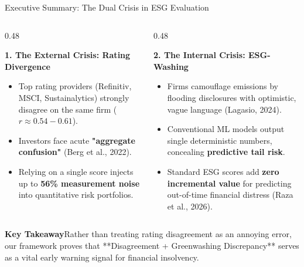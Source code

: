 \documentclass[aspectratio=169,10pt]{beamer}
\newcommand{\takeaway}[1]{\vspace{2pt}\begin{alertblock}{\textbf{Key Takeaway}}#1\end{alertblock}}
\begin{document}
\begin{frame}[t]{Executive Summary: The Dual Crisis in ESG Evaluation}
\small
\begin{columns}[T]
  \begin{column}{0.48\textwidth}
    \begin{block}{\textbf{1. The External Crisis: Rating Divergence}}
      \begin{itemize}\setlength{\itemsep}{3pt}
        \item Top rating providers (Refinitiv, MSCI, Sustainalytics) strongly disagree on the same firm ($r \approx 0.54 - 0.61$).
        \item Investors face acute \textbf{"aggregate confusion"} (Berg et al., 2022).
        \item Relying on a single score injects up to \textbf{56\% measurement noise} into quantitative risk portfolios.
      \end{itemize}
    \end{block}
  \end{column}
  
  \begin{column}{0.48\textwidth}
    \begin{alertblock}{\textbf{2. The Internal Crisis: ESG-Washing}}
      \begin{itemize}\setlength{\itemsep}{3pt}
        \item Firms camouflage emissions by flooding disclosures with optimistic, vague language (Lagasio, 2024).
        \item Conventional ML models output single deterministic numbers, concealing \textbf{predictive tail risk}.
        \item Standard ESG scores add \textbf{zero incremental value} for predicting out-of-time financial distress (Raza et al., 2026).
      \end{itemize}
    \end{alertblock}
  \end{column}
\end{columns}
\vspace{4pt}
\takeaway{Rather than treating rating disagreement as an annoying error, our framework proves that **Disagreement + Greenwashing Discrepancy** serves as a vital early warning signal for financial insolvency.}
\end{frame}
\end{document}
